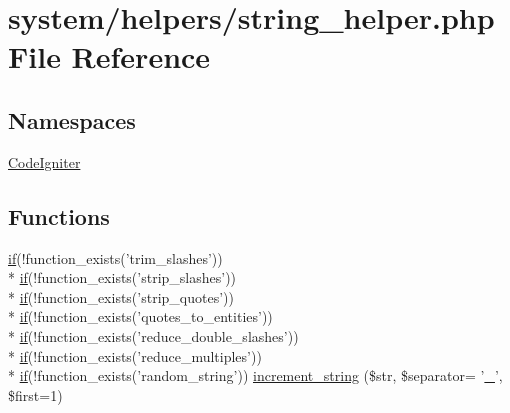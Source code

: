 \hypertarget{string__helper_8php}{\section{system/helpers/string\-\_\-helper.php File Reference}
\label{string__helper_8php}
}
\subsection*{Namespaces}
\begin{DoxyCompactItemize}
\item 
\hyperlink{namespace_code_igniter}{Code\-Igniter}
\end{DoxyCompactItemize}
\subsection*{Functions}
\begin{DoxyCompactItemize}
\item 
\hyperlink{bootstrap_8min_8js_afac0f023df4d3c79a9b54c1aae1fbdc3}{if}(!function\-\_\-exists('trim\-\_\-slashes')) \\*
\hyperlink{bootstrap_8min_8js_afac0f023df4d3c79a9b54c1aae1fbdc3}{if}(!function\-\_\-exists('strip\-\_\-slashes')) \\*
\hyperlink{bootstrap_8min_8js_afac0f023df4d3c79a9b54c1aae1fbdc3}{if}(!function\-\_\-exists('strip\-\_\-quotes')) \\*
\hyperlink{bootstrap_8min_8js_afac0f023df4d3c79a9b54c1aae1fbdc3}{if}(!function\-\_\-exists('quotes\-\_\-to\-\_\-entities')) \\*
\hyperlink{bootstrap_8min_8js_afac0f023df4d3c79a9b54c1aae1fbdc3}{if}(!function\-\_\-exists('reduce\-\_\-double\-\_\-slashes')) \\*
\hyperlink{bootstrap_8min_8js_afac0f023df4d3c79a9b54c1aae1fbdc3}{if}(!function\-\_\-exists('reduce\-\_\-multiples')) \\*
\hyperlink{bootstrap_8min_8js_afac0f023df4d3c79a9b54c1aae1fbdc3}{if}(!function\-\_\-exists('random\-\_\-string')) \hyperlink{string__helper_8php_a006e718dc1169a55ffb0679350b0a4f5}{increment\-\_\-string} (\$str, \$separator= '\hyperlink{mathquill_8js_a18f05aeddc212b523b40818fa2b87b33}{\-\_\-}', \$first=1)
\end{DoxyCompactItemize}



